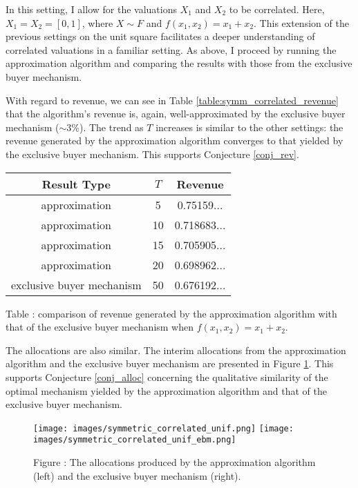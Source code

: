 In this setting, I allow for the valuations $X_1$ and $X_2$ to be correlated. Here, $X_1 = X_2 = [0,1]$, where $X \sim F$ and $f(x_1,x_2) = x_1+x_2$. This extension of the previous settings on the unit square facilitates a deeper understanding of correlated valuations in a familiar setting. As above, I proceed by running the approximation algorithm and comparing the results with those from the exclusive buyer mechanism.

With regard to revenue, we can see in Table \ref{table:symm_correlated_revenue} that the algorithm's revenue is, again, well-approximated by the exclusive buyer mechanism ($\sim$3\%). The trend as $T$ increases is similar to the other settings: the revenue generated by the approximation algorithm converges to that yielded by the exclusive buyer mechanism. This supports Conjecture \ref{conj_rev}.

\begin{center}
    \begin{tabular}{ |c|c|c| } 
    \hline
    Result Type & $T$ & Revenue \\
    \hline
    \hline
    approximation & 5 & 0.75159... \\ 
    approximation & 10 & 0.718683... \\ 
    approximation & 15 & 0.705905... \\ 
    approximation & 20 & 0.698962... \\ 
    exclusive buyer mechanism & 50 & 0.676192... \\
    \hline
    \end{tabular}

    \vspace{1mm}
    \raggedright{\small {\sc Table \thefig\label{table:symm_correlated_revenue}:} comparison of revenue generated by the approximation algorithm with that of the exclusive buyer mechanism when $f(x_1,x_2) = x_1 + x_2$.}
\end{center}

The allocations are also similar. The interim allocations from the approximation algorithm and the exclusive buyer mechanism are presented in Figure \ref{fig:symmetric_correlated_alloc}. This supports Conjecture \ref{conj_alloc} concerning the qualitative similarity of the optimal mechanism yielded by the approximation algorithm and that of the exclusive buyer mechanism.

\begin{figure}[H]
    \begin{center}
    \texttt{[image: images/symmetric\_correlated\_unif.png]}
    \texttt{[image: images/symmetric\_correlated\_unif\_ebm.png]}
    \end{center}
    
    \vspace{1mm}
    \raggedright{\small {\sc Figure \thefig\label{fig:symmetric_correlated_alloc}:} The allocations produced by the approximation algorithm (left) and the exclusive buyer mechanism (right).} 
\end{figure}

